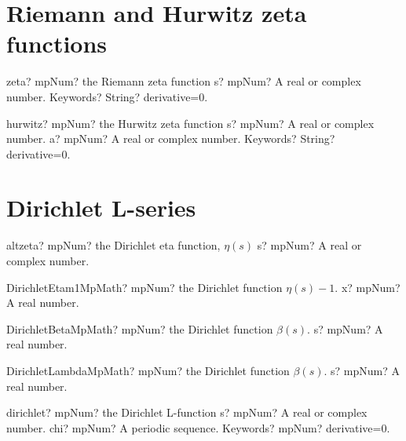 \documentclass[12pt,a4paper,openany]{book}
\begin{document}
\section{Riemann and Hurwitz zeta functions}

\begin{mpFunctionsExtract}
\mpFunctionTwo
{zeta? mpNum? the Riemann zeta function}
{s? mpNum? A real or complex number.}
{Keywords? String? derivative=0.}
\end{mpFunctionsExtract}

\begin{mpFunctionsExtract}
\mpFunctionThree
{hurwitz? mpNum? the  Hurwitz  zeta function}
{s? mpNum? A real or complex number.}
{a? mpNum? A real or complex number.}
{Keywords? String? derivative=0.}
\end{mpFunctionsExtract}

\section{Dirichlet L-series}

\begin{mpFunctionsExtract}
\mpFunctionOne
{altzeta? mpNum? the Dirichlet eta function, $\eta(s)$}
{s? mpNum? A real or complex number.}
\end{mpFunctionsExtract}

\begin{mpFunctionsExtract}
\mpFunctionOneNotImplemented
{DirichletEtam1MpMath? mpNum? the Dirichlet function $\eta(s) - 1$.}
{x? mpNum? A real number.}
\end{mpFunctionsExtract}

\begin{mpFunctionsExtract}
\mpFunctionOneNotImplemented
{DirichletBetaMpMath? mpNum? the Dirichlet function $\beta(s)$.}
{s? mpNum? A real number.}
\end{mpFunctionsExtract}

\begin{mpFunctionsExtract}
\mpFunctionOneNotImplemented
{DirichletLambdaMpMath? mpNum? the Dirichlet function $\beta(s)$.}
{s? mpNum? A real number.}
\end{mpFunctionsExtract}

\begin{mpFunctionsExtract}
\mpFunctionThree
{dirichlet? mpNum? the Dirichlet L-function}
{s? mpNum? A real or complex number.}
{chi? mpNum? A periodic sequence.}
{Keywords? mpNum? derivative=0.}
\end{mpFunctionsExtract}
\end{document}
